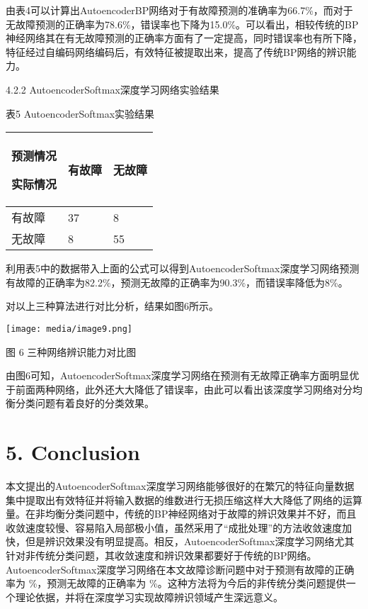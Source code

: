 由表4可以计算出AutoencoderBP网络对于有故障预测的准确率为66.7\%，而对于无故障预测的正确率为78.6\%，错误率也下降为15.0\%。可以看出，相较传统的BP神经网络其在有无故障预测的正确率方面有了一定提高，同时错误率也有所下降，特征经过自编码网络编码后，有效特征被提取出来，提高了传统BP网络的辨识能力。

4.2.2 AutoencoderSoftmax深度学习网络实验结果

表5 AutoencoderSoftmax实验结果

\begin{longtable}[c]{@{}lll@{}}
\toprule
预测情况

实际情况 & 有故障 & 无故障\tabularnewline
\midrule
\endhead
有故障 & 37 & 8\tabularnewline
无故障 & 8 & 55\tabularnewline
\bottomrule
\end{longtable}

利用表5中的数据带入上面的公式可以得到AutoencoderSoftmax深度学习网络预测有故障的正确率为82.2\%，预测无故障的正确率为90.3\%，而错误率降低为8\%。

对以上三种算法进行对比分析，结果如图6所示。

\texttt{[image: media/image9.png]}

图 6 三种网络辨识能力对比图

由图6可知，AutoencoderSoftmax深度学习网络在预测有无故障正确率方面明显优于前面两种网络，此外还大大降低了错误率，由此可以看出该深度学习网络对分均衡分类问题有着良好的分类效果。

\section{5. Conclusion }\label{conclusion}

本文提出的AutoencoderSoftmax深度学习网络能够很好的在繁冗的特征向量数据集中提取出有效特征并将输入数据的维数进行无损压缩这样大大降低了网络的运算量。在非均衡分类问题中，传统的BP神经网络对于故障的辨识效果并不好，而且收敛速度较慢、容易陷入局部极小值，虽然采用了``成批处理''的方法收敛速度加快，但是辨识效果没有明显提高。相反，AutoencoderSoftmax深度学习网络尤其针对非传统分类问题，其收敛速度和辨识效果都要好于传统的BP网络。AutoencoderSoftmax深度学习网络在本文故障诊断问题中对于预测有故障的正确率为
\%，预测无故障的正确率为
\%。这种方法将为今后的非传统分类问题提供一个理论依据，并将在深度学习实现故障辨识领域产生深远意义。

\documentclass{ctacn}%

\usepackage{newtxtext}
\usepackage{hhline}
\usepackage{ctex}

